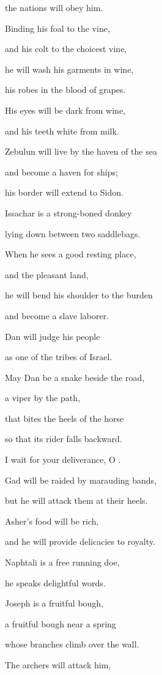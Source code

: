 {\par }{\Q the nations
will obey him.
\par }{\Q {}Binding
his foal
to the vine,
\par }{\Q and his colt
to the choicest vine,
\par }{\Q he will wash
his garments
in wine,
\par }{\Q his robes
in the blood
of grapes.
\par }{\Q {}His eyes
will be dark
from wine,
\par }{\Q and his teeth
white
from milk.
\par }{\Q {}Zebulun
will live
by the haven
of the sea
\par }{\Q and become a haven
for ships;
\par }{\Q his border will extend to Sidon.
\par }{\Q {}Issachar
is a strong-boned
donkey
\par }{\Q lying down
between
two saddlebags.
\par }{\Q {}When he sees
a good
resting place,
\par }{\Q and the pleasant
land,
\par }{\Q he will bend
his shoulder
to the burden
\par }{\Q and become
a slave
laborer.
\par }{\Q {}Dan
will judge
his people
\par }{\Q as one
of the tribes
of Israel.
\par }{\Q {}May
Dan
be a snake
beside
the road,
\par }{\Q a viper
by the path,
\par }{\Q that bites
the heels
of the horse
\par }{\Q so that its rider
falls
backward.
\par }{\Q {}I wait
for your deliverance,
O
{}.
\par }{\Q {}Gad
will be raided
by marauding bands,
\par }{\Q but he will attack
them at their heels.
\par }{\Q {}Asher’s
food
will be rich,
\par }{\Q and he
will provide
delicacies
to royalty.
\par }{\Q {}Naphtali
is a free running
doe,
\par }{\Q he speaks
delightful
words.
\par }{\Q {}Joseph
is a fruitful
bough,
\par }{\Q a fruitful
bough near a spring
\par }{\Q whose branches
climb over the wall.
\par }{\Q {}The archers
will attack
him,

}
